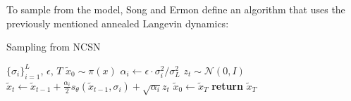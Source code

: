 \documentclass{article}
\begin{document}
\\\\
To sample from the model, Song and Ermon \cite{song2020generative} define an algorithm that uses the previously mentioned annealed Langevin dynamics:
\begin{algorithm}[H]
  \centering
  \caption{Sampling from NCSN}\label{alg:ncsn}
  \begin{algorithmic}[1]
    \Require $\{\sigma_i\}_{i=1}^L$, $\epsilon$, $T$ 
    \State $\tilde{x}_0 \sim \pi(x)$
      \State $\alpha_i \leftarrow \epsilon \cdot \sigma_i^2 / \sigma_L^2$
        \State $z_t \sim \mathcal{N}(0, I)$
        \State $\tilde{x}_t \leftarrow \tilde{x}_{t-1} + \frac{\alpha_i}{2} s_\theta (\tilde{x}_{t-1}, \sigma_i) + \sqrt{\alpha_i} z_t$
      \EndFor
      \State $\tilde{x}_0 \leftarrow \tilde{x}_T$
    \EndFor
    \State \textbf{return} $\tilde{x}_T$
  \end{algorithmic}
\end{algorithm}
\end{document}
